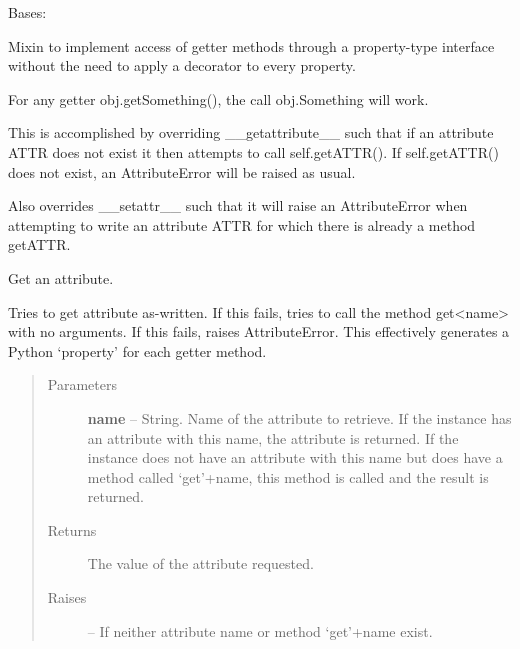 \documentclass[letterpaper,10pt,english]{sphinxmanual}
\begin{document}

\begin{fulllineitems}
\label{eqtools:eqtools.core.PropertyAccessMixin}
Bases: 

Mixin to implement access of getter methods through a property-type
interface without the need to apply a decorator to every property.

For any getter obj.getSomething(), the call obj.Something will work.

This is accomplished by overriding \_\_getattribute\_\_ such that if an
attribute ATTR does not exist it then attempts to call self.getATTR(). If
self.getATTR() does not exist, an AttributeError will be raised as usual.

Also overrides \_\_setattr\_\_ such that it will raise an AttributeError when
attempting to write an attribute ATTR for which there is already a method
getATTR.

\begin{fulllineitems}
\label{eqtools:eqtools.core.PropertyAccessMixin.__getattribute__}
Get an attribute.

Tries to get attribute as-written. If this fails, tries to call the
method get\textless{}name\textgreater{} with no arguments. If this fails, raises
AttributeError. This effectively generates a Python `property' for
each getter method.
\begin{quote}\begin{description}
\item[{Parameters }] \leavevmode
\textbf{name} --
String.
Name of the attribute to retrieve. If the instance
has an attribute with this name, the attribute is returned. If
the instance does not have an attribute with this name but does
have a method called `get'+name, this method is called and the
result is returned.

\item[{Returns}] \leavevmode
The value of the attribute requested.

\item[{Raises }] \leavevmode
{} -- 
If neither attribute name or method `get'+name exist.

\end{description}\end{quote}


\end{fulllineitems}
\end{fulllineitems}
\end{document}
